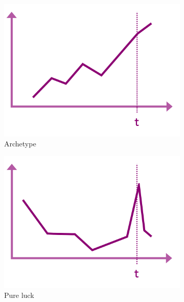 \documentclass[conference]{IEEEtran}
\begin{document}
\begin{figure}[h!]
    \centering
    \begin{subfigure}{.33\linewidth}
        \centering
        \includegraphics[width=\linewidth]{../5. report/pictures/preproccessing1.png}
        \caption{Archetype}
        \label{fig:preprocessing1}
    \end{subfigure}%
    \begin{subfigure}{.33\linewidth}
        \centering
        \includegraphics[width=\linewidth]{../5. report/pictures/preproccessing2.png}
        \caption{Pure luck}
        \label{fig:preprocessing2}
    \end{subfigure}%
    \begin{subfigure}{.33\linewidth}

\end{subfigure}
\end{figure}
\end{document}
